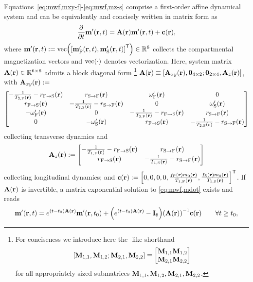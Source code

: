 Equations~\eqref{eq:mwf,mxy-f}-\eqref{eq:mwf,mz-s}
comprise a first-order affine dynamical system
and can be equivalently and concisely written
in matrix form as
\begin{align}
	\dela{t} \bmmp\prt = \bmA\pr \bmmp\prt + \bmc\pr,
	\label{eq:mwf,mdot}
\end{align}	
where $\bmmp\prt := \vect{\brac{\bmmpf\prt, \bmmps\prt}\tpose} \in \reals{6}$
collects the compartmental magnetization vectors
and $\vect{\cdot}$ denotes vectorization.
Here,
system matrix $\bmA\pr \in \reals{6 \times 6}$ 
admits a block diagonal form
\footnote{%
	For conciseness we introduce here 
	the \matlab-like shorthand 
	$$\brac{\bmM_{1,1}, \bmM_{1,2}; \bmM_{2,1}, \bmM_{2,2}} 
		\equiv
		\begin{bmatrix}
			\bmM_{1,1} \bmM_{1,2} \\
			\bmM_{2,1} \bmM_{2,2}
		\end{bmatrix}$$
	for all appropriately sized submatrices 
	$\mathbf{M}_{1,1}, \mathbf{M}_{1,2}, \mathbf{M}_{2,1}, \mathbf{M}_{2,2}$.
}
$\bmA\pr \equiv \brac{\bmAxy\pr, \zeros{4 \times 2}; \zeros{2 \times 4}, \bmAz\pr}$,
with $\bmAxy\pr :=$
\begin{align}
	\begin{bmatrix}
		-\frac{1}{\tf{2}\pr}-\rfs\pr & \rsf\pr & \ompf\pr & 0 \\
		\rfs\pr & -\frac{1}{\ts{2}\pr}-\rsf\pr & 0 & \omps\pr \\
		-\ompf\pr & 0 & -\frac{1}{\tf{2}\pr}-\rfs\pr & \rsf\pr \\
		0 & -\omps\pr & \rfs\pr & -\frac{1}{\ts{2}\pr}-\rsf\pr 
	\end{bmatrix}
	\label{eq:mwf,Axy}
\end{align}
collecting transverse dynamics and
\begin{align}
	\bmAz\pr :=
	\begin{bmatrix}
		-\frac{1}{\tf{1}\pr}-\rfs\pr & \rsf\pr \\
		\rfs\pr & -\frac{1}{\ts{1}\pr}-\rsf\pr
		\label{eq:mwf,Az}
	\end{bmatrix}
\end{align}
collecting longitudinal dynamics; and
$\bmc\pr := \brac{0, 0, 0, 0, 
\frac{\ff\pr \mzero\pr}{\tf{1}\pr}, 
\frac{\fs\pr \mzero\pr}{\ts{1}\pr}}\tpose$.
If $\bmA\pr$ is invertible,
a matrix exponential solution 
to \eqref{eq:mwf,mdot}
exists and reads
\begin{align}
	\bmmp\prt = e^{\paren{t-t_0}\bmA\pr} \bmmp\prtz +
		\paren{e^{\paren{t-t_0}\bmA\pr} - \eye{6}} \inv{\bmA\pr} \bmc\pr
		\qquad \forall t \geq t_0,
		\label{eq:mwf,epr}
\end{align}
